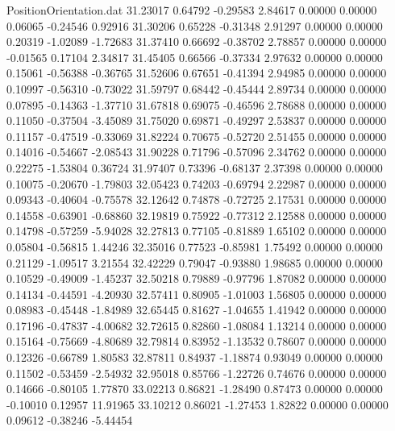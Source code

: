 \begin{filecontents}{PositionOrientation.dat}
  31.23017    0.64792   -0.29583     2.84617    0.00000    0.00000    0.06065   -0.24546    0.92916
  31.30206    0.65228   -0.31348     2.91297    0.00000    0.00000    0.20319   -1.02089   -1.72683
  31.37410    0.66692   -0.38702     2.78857    0.00000    0.00000   -0.01565    0.17104    2.34817
  31.45405    0.66566   -0.37334     2.97632    0.00000    0.00000    0.15061   -0.56388   -0.36765
  31.52606    0.67651   -0.41394     2.94985    0.00000    0.00000    0.10997   -0.56310   -0.73022
  31.59797    0.68442   -0.45444     2.89734    0.00000    0.00000    0.07895   -0.14363   -1.37710
  31.67818    0.69075   -0.46596     2.78688    0.00000    0.00000    0.11050   -0.37504   -3.45089
  31.75020    0.69871   -0.49297     2.53837    0.00000    0.00000    0.11157   -0.47519   -0.33069
  31.82224    0.70675   -0.52720     2.51455    0.00000    0.00000    0.14016   -0.54667   -2.08543
  31.90228    0.71796   -0.57096     2.34762    0.00000    0.00000    0.22275   -1.53804    0.36724
  31.97407    0.73396   -0.68137     2.37398    0.00000    0.00000    0.10075   -0.20670   -1.79803
  32.05423    0.74203   -0.69794     2.22987    0.00000    0.00000    0.09343   -0.40604   -0.75578
  32.12642    0.74878   -0.72725     2.17531    0.00000    0.00000    0.14558   -0.63901   -0.68860
  32.19819    0.75922   -0.77312     2.12588    0.00000    0.00000    0.14798   -0.57259   -5.94028
  32.27813    0.77105   -0.81889     1.65102    0.00000    0.00000    0.05804   -0.56815    1.44246
  32.35016    0.77523   -0.85981     1.75492    0.00000    0.00000    0.21129   -1.09517    3.21554
  32.42229    0.79047   -0.93880     1.98685    0.00000    0.00000    0.10529   -0.49009   -1.45237
  32.50218    0.79889   -0.97796     1.87082    0.00000    0.00000    0.14134   -0.44591   -4.20930
  32.57411    0.80905   -1.01003     1.56805    0.00000    0.00000    0.08983   -0.45448   -1.84989
  32.65445    0.81627   -1.04655     1.41942    0.00000    0.00000    0.17196   -0.47837   -4.00682
  32.72615    0.82860   -1.08084     1.13214    0.00000    0.00000    0.15164   -0.75669   -4.80689
  32.79814    0.83952   -1.13532     0.78607    0.00000    0.00000    0.12326   -0.66789    1.80583
  32.87811    0.84937   -1.18874     0.93049    0.00000    0.00000    0.11502   -0.53459   -2.54932
  32.95018    0.85766   -1.22726     0.74676    0.00000    0.00000    0.14666   -0.80105    1.77870
  33.02213    0.86821   -1.28490     0.87473    0.00000    0.00000   -0.10010    0.12957   11.91965
  33.10212    0.86021   -1.27453     1.82822    0.00000    0.00000    0.09612   -0.38246   -5.44454

\end{filecontents}
